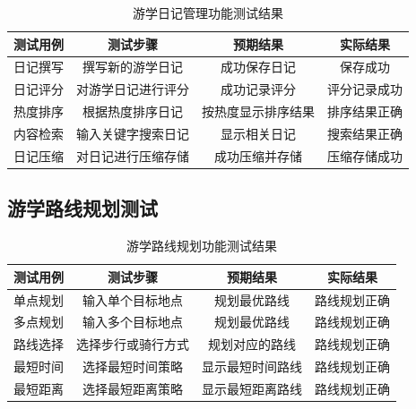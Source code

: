 \documentclass{ctexart}
\begin{document}
\begin{table}[H]
    \centering
    \caption{游学日记管理功能测试结果}
    \begin{tabular}{|c|c|c|c|}
        \hline
        \textbf{测试用例} & \textbf{测试步骤} & \textbf{预期结果} & \textbf{实际结果} \\ \hline
        日记撰写          & 撰写新的游学日记      & 成功保存日记        & 保存成功          \\ \hline
        日记评分          & 对游学日记进行评分     & 成功记录评分        & 评分记录成功        \\ \hline
        热度排序          & 根据热度排序日记      & 按热度显示排序结果     & 排序结果正确        \\ \hline
        内容检索          & 输入关键字搜索日记     & 显示相关日记        & 搜索结果正确        \\ \hline
        日记压缩          & 对日记进行压缩存储     & 成功压缩并存储       & 压缩存储成功        \\ \hline
    \end{tabular}
\end{table}

\subsection{游学路线规划测试}

\begin{table}[H]
    \centering
    \caption{游学路线规划功能测试结果}
    \begin{tabular}{|c|c|c|c|}
        \hline
        \textbf{测试用例} & \textbf{测试步骤} & \textbf{预期结果} & \textbf{实际结果} \\ \hline
        单点规划          & 输入单个目标地点      & 规划最优路线        & 路线规划正确        \\ \hline
        多点规划          & 输入多个目标地点      & 规划最优路线        & 路线规划正确        \\ \hline
        路线选择          & 选择步行或骑行方式     & 规划对应的路线       & 路线规划正确        \\ \hline
        最短时间          & 选择最短时间策略      & 显示最短时间路线      & 路线规划正确        \\ \hline
        最短距离          & 选择最短距离策略      & 显示最短距离路线      & 路线规划正确        \\ \hline
    \end{tabular}
\end{table}
\end{document}
